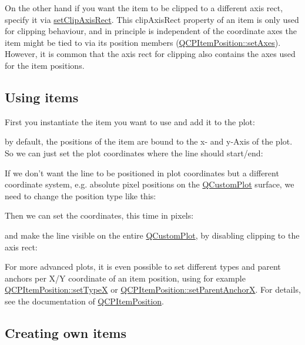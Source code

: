 \-On the other hand if you want the item to be clipped to a different axis rect, specify it via \hyperlink{classQCPAbstractItem_a7dc75fcbcd10206fe0b75d757ea7a347}{set\-Clip\-Axis\-Rect}. \-This clip\-Axis\-Rect property of an item is only used for clipping behaviour, and in principle is independent of the coordinate axes the item might be tied to via its position members (\hyperlink{classQCPItemPosition_a2185f45c75ac8cb9be89daeaaad50e37}{\-Q\-C\-P\-Item\-Position\-::set\-Axes}). \-However, it is common that the axis rect for clipping also contains the axes used for the item positions.\hypertarget{classQCPAbstractItem_items-using}{}\subsection{\-Using items}\label{classQCPAbstractItem_items-using}
\-First you instantiate the item you want to use and add it to the plot\-: 
\begin{DoxyCodeInclude}
\end{DoxyCodeInclude}
 by default, the positions of the item are bound to the x-\/ and y-\/\-Axis of the plot. \-So we can just set the plot coordinates where the line should start/end\-: 
\begin{DoxyCodeInclude}
\end{DoxyCodeInclude}
 \-If we don't want the line to be positioned in plot coordinates but a different coordinate system, e.\-g. absolute pixel positions on the \hyperlink{classQCustomPlot}{\-Q\-Custom\-Plot} surface, we need to change the position type like this\-: 
\begin{DoxyCodeInclude}
\end{DoxyCodeInclude}
 \-Then we can set the coordinates, this time in pixels\-: 
\begin{DoxyCodeInclude}
\end{DoxyCodeInclude}
 and make the line visible on the entire \hyperlink{classQCustomPlot}{\-Q\-Custom\-Plot}, by disabling clipping to the axis rect\-: 
\begin{DoxyCodeInclude}
\end{DoxyCodeInclude}
 \-For more advanced plots, it is even possible to set different types and parent anchors per \-X/\-Y coordinate of an item position, using for example \hyperlink{classQCPItemPosition_a2113b2351d6d00457fb3559a4e20c3ea}{\-Q\-C\-P\-Item\-Position\-::set\-Type\-X} or \hyperlink{classQCPItemPosition_add71461a973927c74e42179480916d9c}{\-Q\-C\-P\-Item\-Position\-::set\-Parent\-Anchor\-X}. \-For details, see the documentation of \hyperlink{classQCPItemPosition}{\-Q\-C\-P\-Item\-Position}.\hypertarget{classQCPAbstractItem_items-subclassing}{}\subsection{\-Creating own items}\label{classQCPAbstractItem_items-subclassing}
